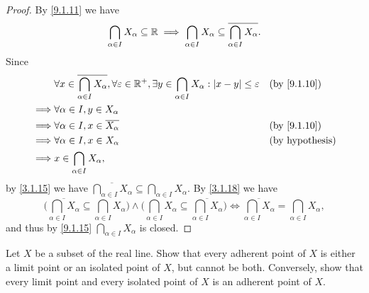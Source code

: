 \begin{proof}
	By \cref{9.1.11} we have
	\[
		\bigcap_{\alpha \in I} X_{\alpha} \subseteq \mathbb{R} \implies \bigcap_{\alpha \in I} X_{\alpha} \subseteq \overline{\bigcap_{\alpha \in I} X_{\alpha}}.
	\]
	Since
	\begin{align*}
		         & \forall x \in \overline{\bigcap_{\alpha \in I} X_{\alpha}}, \forall \varepsilon \in \R^+, \exists y \in \bigcap_{\alpha \in I} X_{\alpha} : \abs{x - y} \leq \varepsilon &  & \by{9.1.10}            \\
		\implies & \forall \alpha \in I, y \in X_{\alpha}                                                                                                                                                               \\
		\implies & \forall \alpha \in I, x \in \overline{X_{\alpha}}                                                                                                                        &  & \by{9.1.10}            \\
		\implies & \forall \alpha \in I, x \in X_{\alpha}                                                                                                                                   &  & \text{(by hypothesis)} \\
		\implies & x \in \bigcap_{\alpha \in I} X_{\alpha},
	\end{align*}
	by \cref{3.1.15} we have \(\overline{\bigcap_{\alpha \in I} X_{\alpha}} \subseteq \bigcap_{\alpha \in I} X_{\alpha}\).
	By \cref{3.1.18} we have
	\[
		\bigg(\overline{\bigcap_{\alpha \in I} X_{\alpha}} \subseteq \bigcap_{\alpha \in I} X_{\alpha}\bigg) \land \bigg(\bigcap_{\alpha \in I} X_{\alpha} \subseteq \overline{\bigcap_{\alpha \in I} X_{\alpha}}\bigg) \iff \overline{\bigcap_{\alpha \in I} X_{\alpha}} = \bigcap_{\alpha \in I} X_{\alpha},
	\]
	and thus by \cref{9.1.15} \(\bigcap_{\alpha \in I} X_{\alpha}\) is closed.
\end{proof}

\begin{ex}\label{ex:9.1.9}
	Let \(X\) be a subset of the real line.
	Show that every adherent point of \(X\) is either a limit point or an isolated point of \(X\), but cannot be both.
	Conversely, show that every limit point and every isolated point of \(X\) is an adherent point of \(X\).
\end{ex}

